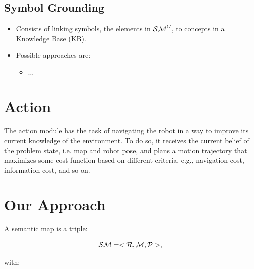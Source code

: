\documentclass{article}
\begin{document}
	\subsection{Symbol Grounding}
	
	\begin{itemize}
		\item Consists of linking symbols, the elements in $\mathcal{SM}^G$, to concepts in a Knowledge Base (KB).
		\item Possible approaches are:
		\begin{itemize}
			\item $\dots$
		\end{itemize}
	\end{itemize}	

	\section{Action}
	
	The action module has the task of navigating the robot in a way to improve its current knowledge of the environment. To do so, it receives the current belief of the problem state, i.e. map and robot pose, and plans a motion trajectory that maximizes some cost function based on different criteria, e.g., navigation cost, information cost, and so on.
	
	\clearpage
	
	
	
	\clearpage

	\section{Our Approach}
	
	A semantic map is a triple:
	
	\begin{equation}
	\mathcal{SM} = < \mathcal{R}, \mathcal{M}, \mathcal{P} >,
	\end{equation}
	
	\noindent
	with:
		
\end{document}
